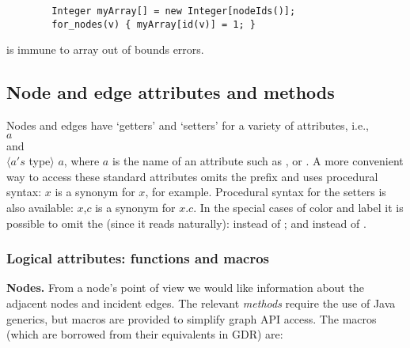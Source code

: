 \begin{minipage}{0.8\textwidth}
\begin{verbatim}
        Integer myArray[] = new Integer[nodeIds()];
        for_nodes(v) { myArray[id(v)] = 1; }
\end{verbatim}
\end{minipage}

is immune to array out of bounds errors.

\subsection{Node and edge attributes and methods} \label{sec:nodes_and_edges}

Nodes and edges have `getters' and `setters' for
a variety of attributes, i.e.,
\\
$a$
\\
and
\\
$\langle a's$ type$\rangle$ $a$\Code{()},
where $a$ is the name of an attribute such as
,
 or .
A more convenient way to access these standard attributes omits the prefix 
and uses procedural syntax:
$x$\Code{)} is a synonym for $x$, for example.
Procedural syntax for the setters is also available:
$x$,$c$\Code{)} is a synonym for $x$.$c$\Code{)}.
In the special cases of color and label it is possible to omit the 
(since it reads naturally):
 instead of
;
and
 instead of
.

\subsubsection{Logical attributes: functions and macros}

\textbf{Nodes.} From a node's point of view we would like information about
 the adjacent nodes and incident edges.  The relevant \emph{methods} require
 the use of Java generics, but macros are provided to simplify graph API
 access. The macros (which are borrowed from their equivalents in GDR) are:

